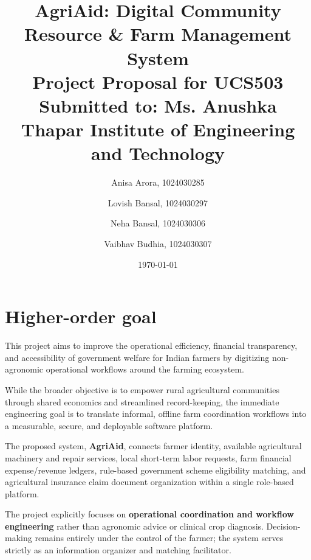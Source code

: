 \documentclass[11pt,a4paper]{article}
\title{\textbf{AgriAid: Digital Community Resource \& Farm Management System}\\[0.3em]
\large Project Proposal for UCS503\\
\large Submitted to: Ms. Anushka\\
\textbf{Thapar Institute of Engineering and Technology}}
\author{
Anisa Arora, 1024030285 \and
Lovish Bansal, 1024030297 \and
Neha Bansal, 1024030306 \and
Vaibhav Budhia, 1024030307
}
\date{\today}
\begin{document}
\maketitle

\section{Higher-order goal}
This project aims to improve the operational efficiency, financial transparency, and accessibility of government welfare for Indian farmers by digitizing non-agronomic operational workflows around the farming ecosystem.

While the broader objective is to empower rural agricultural communities through shared economics and streamlined record-keeping, the immediate engineering goal is to translate informal, offline farm coordination workflows into a measurable, secure, and deployable software platform.

The proposed system, \textbf{AgriAid}, connects farmer identity, available agricultural machinery and repair services, local short-term labor requests, farm financial expense/revenue ledgers, rule-based government scheme eligibility matching, and agricultural insurance claim document organization within a single role-based platform.

The project explicitly focuses on \textbf{operational coordination and workflow engineering} rather than agronomic advice or clinical crop diagnosis. Decision-making remains entirely under the control of the farmer; the system serves strictly as an information organizer and matching facilitator.
\end{document}

